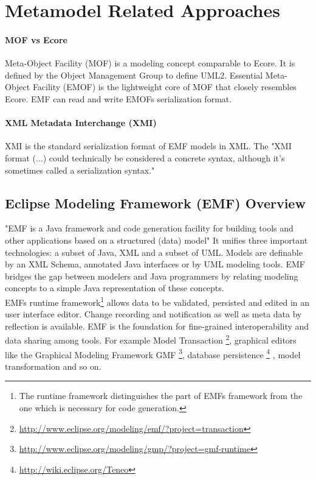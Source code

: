 \section{Metamodel Related Approaches}

\paragraph{MOF vs Ecore}
Meta-Object Facility (MOF) is a modeling concept comparable to Ecore. It is defined by the Object Management Group \cite{OMG} to define UML2. Essential Meta-Object Facility (EMOF) is the lightweight core of MOF that closely resembles Ecore. EMF can read and write EMOFs serialization format. \cite{EMP}

\paragraph{XML Metadata Interchange (XMI)}
XMI is the standard serialization format of EMF models in XML. The "XMI format (...) could technically be considered a concrete syntax, although it's sometimes called a serialization syntax." \cite{EMP}



\subsection{Eclipse Modeling Framework (EMF) Overview}
"EMF is a Java framework and code generation facility for building tools and other applications based on a structured (data) model" \cite{EMFDoc}
 It unifies three important technologies: a subset of Java, XML and a subset of UML. Models are definable by an XML Schema, annotated Java interfaces or by UML modeling tools. EMF bridges the gap between modelers and Java programmers by relating modeling concepts to a simple Java representation of these concepts. \cite{EMF2nd}\\

EMFs runtime framework\footnote{\raggedright The runtime framework distinguishes the part of EMFs framework from the one which is necessary for code generation.}  allows data to be validated, persisted and edited in an user interface editor. Change recording and notification as well as meta data by reflection is available. EMF is the foundation for fine-grained interoperability and data sharing among tools. For example Model Transaction \footnote{\raggedright \url{http://www.eclipse.org/modeling/emf/?project=transaction}}, graphical editors like the Graphical Modeling Framework GMF \footnote{\raggedright \url{http://www.eclipse.org/modeling/gmp/?project=gmf-runtime}}, database persistence \footnote{\raggedright \url{http://wiki.eclipse.org/Teneo}} , model transformation and so on.

